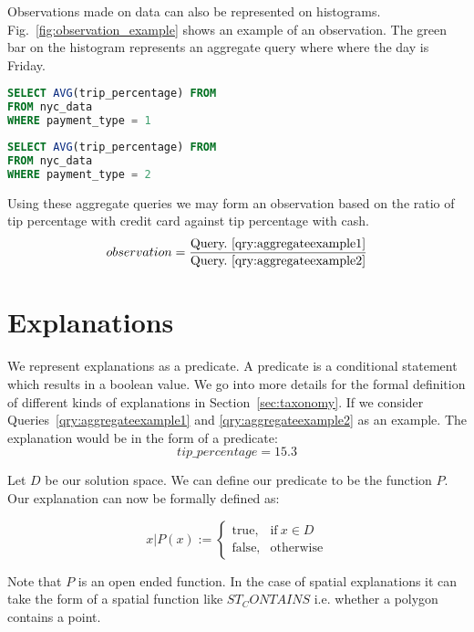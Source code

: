 Observations made on data can also be represented on histograms. Fig.~\ref{fig:observation_example} shows an example of an observation. The green bar on the histogram represents an aggregate query where where the day is Friday.

\renewcommand{\lstlistingname}{Query}%
\begin{lstlisting}[language=SQL, caption=Aggregate Query for average tip percentage with credit cards, label=qry:aggregateexample1]
SELECT AVG(trip_percentage) FROM
FROM nyc_data
WHERE payment_type = 1
\end{lstlisting}

\renewcommand{\lstlistingname}{Query}%
\begin{lstlisting}[language=SQL, caption=Aggregate Query for average tip percentage with cash, label=qry:aggregateexample2]
SELECT AVG(trip_percentage) FROM
FROM nyc_data
WHERE payment_type = 2
\end{lstlisting}

Using these aggregate queries we may form an observation based on the ratio of tip percentage with credit card against tip percentage with cash.
$$observation = \frac{\textnormal{Query.~\ref{qry:aggregateexample1}}}{\textnormal{Query.~\ref{qry:aggregateexample2}}}$$


\section{Explanations}
We represent explanations as a predicate. A predicate is a conditional statement which results in a boolean value. We go into more details for the formal definition of different kinds of explanations in Section~\ref{sec:taxonomy}. If we consider Queries~\ref{qry:aggregateexample1} and \ref{qry:aggregateexample2} as an example. The explanation would be in the form of a predicate:
$$tip\_percentage = 15.3$$

Let $D$ be our solution space. We can define our predicate to be the function $P$. Our explanation can now be formally defined as:

\begin{equation}
x|P(x):=
    \begin{cases}
      \text{true}, & \text{if}\ x \in D \\
      \text{false}, & \text{otherwise}
    \end{cases}
\end{equation}

Note that $P$ is an open ended function. In the case of spatial explanations it can take the form of a spatial function like $ST_CONTAINS$ i.e. whether a polygon contains a point.

